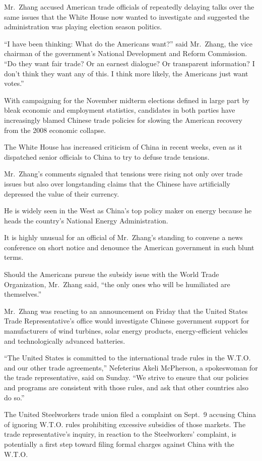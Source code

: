﻿\documentclass[12pt]{article}
\begin{document}
Mr.~Zhang accused American trade officials of repeatedly delaying talks over the same issues that
the White House now wanted to investigate and suggested the administration was playing election
season politics.

``I have been thinking: What do the Americans want?'' said Mr.~Zhang, the vice chairman of the
government's National Development and Reform Commission. ``Do they want fair trade? Or an earnest
dialogue? Or transparent information? I don't think they want any of this. I think more likely, the
Americans just want votes.''

With campaigning for the November midterm elections defined in large part by bleak economic and
employment statistics, candidates in both parties have increasingly blamed Chinese trade policies
for slowing the American recovery from the 2008 economic collapse.

The White House has increased criticism of China in recent weeks, even as it dispatched senior
officials to China to try to defuse trade tensions.

Mr.~Zhang's comments signaled that tensions were rising not only over trade issues but also over
longstanding claims that the Chinese have artificially depressed the value of their currency.

He is widely seen in the West as China's top policy maker on energy because he heads the country's
National Energy Administration.

It is highly unusual for an official of Mr.~Zhang's standing to convene a news conference on short
notice and denounce the American government in such blunt terms.

Should the Americans pursue the subsidy issue with the World Trade Organization, Mr.~Zhang said,
``the only ones who will be humiliated are themselves.''

Mr.~Zhang was reacting to an announcement on Friday that the United States Trade Representative's
office would investigate Chinese government support for manufacturers of wind turbines, solar energy
products, energy-efficient vehicles and technologically advanced batteries.

``The United States is committed to the international trade rules in the W.T.O. and our other trade
agreements,'' Nefeterius Akeli McPherson, a spokeswoman for the trade representative, said on
Sunday. ``We strive to ensure that our policies and programs are consistent with those rules, and
ask that other countries also do so.''

The United Steelworkers trade union filed a complaint on Sept.~9 accusing China of ignoring W.T.O.
rules prohibiting excessive subsidies of those markets. The trade representative's inquiry, in
reaction to the Steelworkers' complaint, is potentially a first step toward filing formal charges
against China with the W.T.O.
\end{document}
